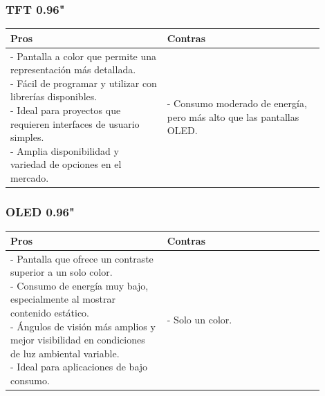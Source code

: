 \subsubsection{\gls{TFT} 0.96"}
\begin{table}[H]
\centering
\small
\begin{tabular}{|p{0.45\linewidth}|p{0.45\linewidth}|}
\hline
\textbf{Pros} &
\textbf{Contras} \\
\hline
\parbox[t]{\linewidth}{
\vspace{0.1cm}
- Pantalla a color que permite una representación más detallada. \bigskip \\
- Fácil de programar y utilizar con librerías disponibles. \bigskip \\
- Ideal para proyectos que requieren interfaces de usuario simples. \bigskip \\
- Amplia disponibilidad y variedad de opciones en el mercado. \vspace{0.1cm}
} &
\parbox[t]{\linewidth}{
\vspace{0.1cm}
- Consumo moderado de energía, pero más alto que las pantallas \gls{OLED}. \bigskip \\
\vspace{0.1cm}
} \\
\hline
\end{tabular}
\end{table}

\subsubsection{OLED 0.96"}
\begin{table}[H]
\centering
\small
\begin{tabular}{|p{0.45\linewidth}|p{0.45\linewidth}|}
\hline
\textbf{Pros} &
\textbf{Contras} \\
\hline
\parbox[t]{\linewidth}{
\vspace{0.1cm}
- Pantalla que ofrece un contraste superior a un solo color. \bigskip \\
- Consumo de energía muy bajo, especialmente al mostrar contenido estático. \bigskip \\
- Ángulos de visión más amplios y mejor visibilidad en condiciones de luz ambiental variable. \bigskip \\
- Ideal para aplicaciones de bajo consumo. \bigskip \\
\vspace{0.1cm}
} &
\parbox[t]{\linewidth}{
\vspace{0.1cm}
- Solo un color. \vspace{0.1cm}
} \\
\hline
\end{tabular}
\end{table}

